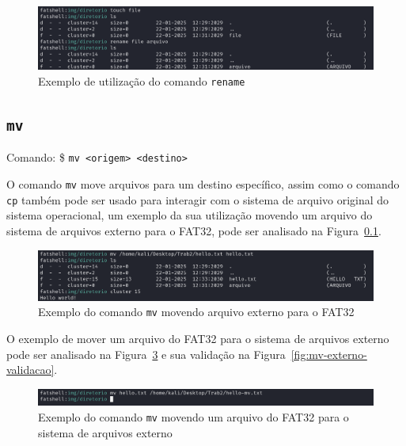 \documentclass[
    12pt,				%
    oneside,   	        %
    a4paper,			%
    english,			%
    french,				%
    spanish,			%
    brazil,				%
    ]{pacotes/abntex2}
\begin{document}
\begin{figure}[H]
    \centering
    \includegraphics[width=450pt]{figuras/resultados/11-rename.PNG}
    \caption{Exemplo de utilização do comando \texttt{rename}}
    \label{fig:rename}
\end{figure}


\subsection{\texttt{mv}}
\label{subsec:mv}
Comando: \$ \texttt{mv <origem> <destino>}

O comando \texttt{mv} move arquivos para um destino específico, assim como o comando \texttt{cp} também pode ser usado para interagir com o sistema de arquivo original do sistema operacional, um exemplo da sua utilização movendo um arquivo do sistema de arquivos externo para o FAT32, pode ser analisado na Figura~\ref{subsec:mv}.

\begin{figure}[H]
    \centering
    \includegraphics[width=450pt]{figuras/resultados/12-mv-externo-iterno.PNG}
    \caption{Exemplo do comando \texttt{mv} movendo arquivo externo para o FAT32}
    \label{fig:mv-externo-interno}
\end{figure}

O exemplo de mover um arquivo do FAT32 para o sistema de arquivos externo pode ser analisado na Figura~\ref{fig:mv-interno-externo} e sua validação na Figura~\ref{fig:mv-externo-validacao}.

\begin{figure}[H]
    \centering
    \includegraphics[width=450pt]{figuras/resultados/13-mv-interno-externo.PNG}
    \caption{Exemplo do comando \texttt{mv} movendo um arquivo do FAT32 para o sistema de arquivos externo}
    \label{fig:mv-interno-externo}
\end{figure}
\end{document}
